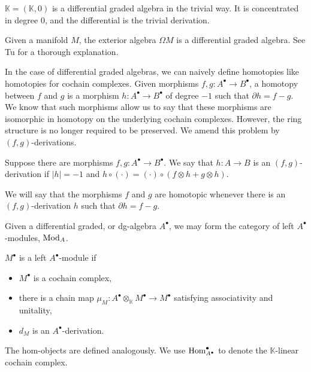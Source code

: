 \documentclass[../thesis.tex]{subfiles}
\begin{document}
            \begin{example}
                $\mathbb{K} = (\mathbb{K},0)$ is a differential graded algebra in the trivial way. It is concentrated in degree $0$, and the differential is the trivial derivation.
            \end{example}
            \begin{example}
                Given a manifold $M$, the exterior algebra $\Omega M$ is a differential graded algebra. See Tu \cite{Tu07} for a thorough explanation.
            \end{example}

            In the case of differential graded algebras, we can naively define homotopies like homotopies for cochain complexes. Given morphisms $f, g : A^\bullet \rightarrow B^\bullet$, a homotopy between $f$ and $g$ is a morphism $h : A^\bullet \rightarrow B^\bullet$ of degree $-1$ such that $\partial h = f - g$. We know that such morphisms allow us to say that these morphisms are isomorphic in homotopy on the underlying cochain complexes. However, the ring structure is no longer required to be preserved. We amend this problem by $(f,g)$-derivations.

            \begin{definition}
                Suppose there are morphisms $f,g: A^\bullet \rightarrow B^\bullet$. We say that $h : A \rightarrow B$ is an $(f,g)$-derivation if $|h| = -1$ and $h \circ (\cdot) = (\cdot)\circ (f \otimes h + g \otimes h)$.
            \end{definition}

            We will say that the morphisms $f$ and $g$ are homotopic whenever there is an $(f,g)$-derivation $h$ such that $\partial h = f - g$.

            Given a differential graded, or dg-algebra $A^\bullet$, we may form the category of left $A^\bullet$-modules, $\tt{Mod}_A$.
            \begin{definition}
                $M^\bullet$ is a left $A^\bullet$-module if
                \begin{itemize}
                    \item $M^\bullet$ is a cochain complex,
                    \item there is a chain map $\mu_M : A^\bullet\otimes_\mathbb{K} M^\bullet \rightarrow M^\bullet$ satisfying associativity and unitality,
                    \item $d_M$ is an $A^\bullet$-derivation.
                \end{itemize}
            \end{definition}
            The hom-objects are defined analogously. We use $\tt{Hom}_{A^\bullet}^\bullet$ to denote the $\mathbb{K}$-linear cochain complex.
\end{document}
